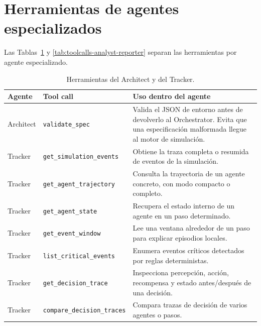 \section{Herramientas de agentes especializados}

Las Tablas~\ref{tab:toolcalls-architect-tracker} y
\ref{tab:toolcalls-analyst-reporter} separan las herramientas por agente
especializado.

\begin{table}[H]
\begin{center}
{\scriptsize
\setlength{\tabcolsep}{6pt}
\renewcommand{\arraystretch}{1.12}
\begin{tabular}{|>{\raggedright\arraybackslash}p{2.3cm}|>{\raggedright\arraybackslash}p{3.2cm}|>{\raggedright\arraybackslash}p{5.9cm}|} \hline
\textbf{Agente} & \textbf{Tool call} & \textbf{Uso dentro del agente} \\ \hline
Architect & \texttt{validate\_spec} & Valida el JSON de entorno antes de devolverlo al Orchestrator. Evita que una especificación malformada llegue al motor de simulación. \\ \hline
Tracker & \texttt{get\_simulation\_events} & Obtiene la traza completa o resumida de eventos de la simulación. \\ \hline
Tracker & \texttt{get\_agent\_trajectory} & Consulta la trayectoria de un agente concreto, con modo compacto o completo. \\ \hline
Tracker & \texttt{get\_agent\_state} & Recupera el estado interno de un agente en un paso determinado. \\ \hline
Tracker & \texttt{get\_event\_window} & Lee una ventana alrededor de un paso para explicar episodios locales. \\ \hline
Tracker & \texttt{list\_critical\_events} & Enumera eventos críticos detectados por reglas deterministas. \\ \hline
Tracker & \texttt{get\_decision\_trace} & Inspecciona percepción, acción, recompensa y estado antes/después de una decisión. \\ \hline
Tracker & \texttt{compare\_\allowbreak decision\_\allowbreak traces} & Compara trazas de decisión de varios agentes o pasos. \\ \hline
\end{tabular}
}
\caption[Herramientas del Architect y Tracker]{Herramientas del Architect y del
Tracker.}
\label{tab:toolcalls-architect-tracker}
\end{center}
\end{table}

